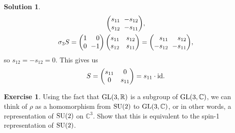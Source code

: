 \documentclass[11pt, a4paper]{report}
\theoremstyle{definition}
\newtheorem{exercise}{Exercise}[part]
\newtheorem{solution}{Solution}[part]
\newenvironment{ex}{\begin{exercise}}{\end{exercise}\pagebreak[1]}
\newenvironment{sol}{\begin{solution}}{\end{solution}\pagebreak[3]}
\newcommand*{\settightmatrix}{\ensuremath\setlength{\arraycolsep}{0.7ex}}
\newenvironment{tightmatrix}
    {\settightmatrix}{}
\newcommand*{\GL}{\ensuremath\text{GL}}
\newcommand*{\SU}{\ensuremath\text{SU}}
\newcommand*{\id}{\ensuremath\mathop{}\mathopen{}\mathrm{id}}
\begin{document}
\begin{sol}
\begin{gather*}
\begin{tightmatrix}
\begin{pmatrix*}[r]
            s_{11} & -s_{12} \\
            s_{12} & -s_{11}
        \end{pmatrix*}\end{tightmatrix}, \\
    \sigma_3 S =
        \begin{tightmatrix}\begin{pmatrix*}[r]
            1 &  0 \\
            0 & -1
        \end{pmatrix*}\end{tightmatrix}
        \begin{pmatrix}
            s_{11} & s_{12} \\
            s_{12} & s_{11}
        \end{pmatrix}
        =
        \begin{tightmatrix}\begin{pmatrix*}[r]
            s_{11}  & s_{12} \\
            -s_{12} & -s_{11}
        \end{pmatrix*}\end{tightmatrix},
\end{gather*}
so $s_{12} = -s_{12} = 0$. This gives us
\[
    S = \begin{pmatrix}
            s_{11} & 0 \\
            0      & s_{11}
        \end{pmatrix}
        = s_{11} \cdot \id.
\]

\end{sol}

\begin{ex}

Using the fact that $\GL(3, \mathbb{R})$ is a subgroup of $\GL(3, \mathbb{C})$, we can think of $\rho$ as a homomorphism from $\SU(2)$ to $\GL(3, \mathbb{C})$, or in other words, a representation of $\SU(2)$ on $\mathbb{C}^3$.
Show that this is equivalent to the spin-1 representation of $\SU(2)$.

\end{ex}
\end{document}
